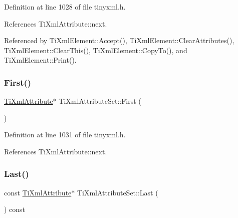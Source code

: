 Definition at line 1028 of file tinyxml.\+h.



References Ti\+Xml\+Attribute\+::next.



Referenced by Ti\+Xml\+Element\+::\+Accept(), Ti\+Xml\+Element\+::\+Clear\+Attributes(), Ti\+Xml\+Element\+::\+Clear\+This(), Ti\+Xml\+Element\+::\+Copy\+To(), and Ti\+Xml\+Element\+::\+Print().

\hypertarget{class_ti_xml_attribute_set_a99703bb08ca2aece2d7ef835de339ba0}{}\label{class_ti_xml_attribute_set_a99703bb08ca2aece2d7ef835de339ba0} 
\subsubsection{\texorpdfstring{First()}{First()}\hspace{0.1cm}{\footnotesize\ttfamily [2/2]}}
{\footnotesize\ttfamily \hyperlink{class_ti_xml_attribute}{Ti\+Xml\+Attribute}$\ast$ Ti\+Xml\+Attribute\+Set\+::\+First (\begin{DoxyParamCaption}{ }\end{DoxyParamCaption})\hspace{0.3cm}{\ttfamily [inline]}}



Definition at line 1031 of file tinyxml.\+h.



References Ti\+Xml\+Attribute\+::next.

\hypertarget{class_ti_xml_attribute_set_a3b0d49f3802effcf377f32d9a359302c}{}\label{class_ti_xml_attribute_set_a3b0d49f3802effcf377f32d9a359302c} 
\subsubsection{\texorpdfstring{Last()}{Last()}\hspace{0.1cm}{\footnotesize\ttfamily [1/2]}}
{\footnotesize\ttfamily const \hyperlink{class_ti_xml_attribute}{Ti\+Xml\+Attribute}$\ast$ Ti\+Xml\+Attribute\+Set\+::\+Last (\begin{DoxyParamCaption}{ }\end{DoxyParamCaption}) const\hspace{0.3cm}{\ttfamily [inline]}}



